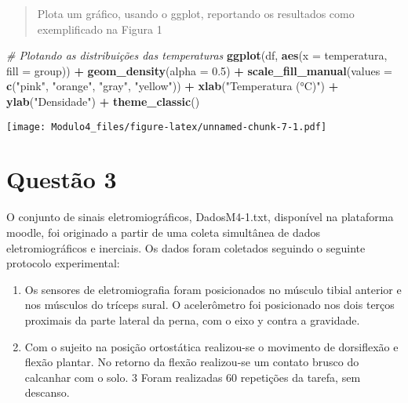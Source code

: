 \documentclass[
]{article}
\newenvironment{Shaded}{\begin{snugshade}}{\end{snugshade}}
\newcommand{\AttributeTok}[1]{\textcolor[rgb]{0.13,0.29,0.53}{#1}}
\newcommand{\CommentTok}[1]{\textcolor[rgb]{0.56,0.35,0.01}{\textit{#1}}}
\newcommand{\FloatTok}[1]{\textcolor[rgb]{0.00,0.00,0.81}{#1}}
\newcommand{\FunctionTok}[1]{\textcolor[rgb]{0.13,0.29,0.53}{\textbf{#1}}}
\newcommand{\NormalTok}[1]{#1}
\newcommand{\SpecialCharTok}[1]{\textcolor[rgb]{0.81,0.36,0.00}{\textbf{#1}}}
\newcommand{\StringTok}[1]{\textcolor[rgb]{0.31,0.60,0.02}{#1}}
\providecommand{\tightlist}{%
  \setlength{\itemsep}{0pt}\setlength{\parskip}{0pt}}
\begin{document}
\begin{quote}
Plota um gráfico, usando o ggplot, reportando os resultados como
exemplificado na Figura 1
\end{quote}

\begin{Shaded}
\begin{Highlighting}[]
\CommentTok{\# Plotando as distribuições das temperaturas}
\FunctionTok{ggplot}\NormalTok{(df, }\FunctionTok{aes}\NormalTok{(}\AttributeTok{x =}\NormalTok{ temperatura, }\AttributeTok{fill =}\NormalTok{ group)) }\SpecialCharTok{+}
  \FunctionTok{geom\_density}\NormalTok{(}\AttributeTok{alpha =} \FloatTok{0.5}\NormalTok{) }\SpecialCharTok{+}
  \FunctionTok{scale\_fill\_manual}\NormalTok{(}\AttributeTok{values =} \FunctionTok{c}\NormalTok{(}\StringTok{"pink"}\NormalTok{, }\StringTok{"orange"}\NormalTok{, }\StringTok{"gray"}\NormalTok{, }\StringTok{"yellow"}\NormalTok{)) }\SpecialCharTok{+}
  \FunctionTok{xlab}\NormalTok{(}\StringTok{"Temperatura (°C)"}\NormalTok{) }\SpecialCharTok{+}
  \FunctionTok{ylab}\NormalTok{(}\StringTok{"Densidade"}\NormalTok{) }\SpecialCharTok{+}
  \FunctionTok{theme\_classic}\NormalTok{()}
\end{Highlighting}
\end{Shaded}

\texttt{[image: Modulo4\_files/figure-latex/unnamed-chunk-7-1.pdf]}

\newpage
\section*{Questão 3}

O conjunto de sinais eletromiográficos, DadosM4-1.txt, disponível na
plataforma moodle, foi originado a partir de uma coleta simultânea de
dados eletromiográficos e inerciais. Os dados foram coletados seguindo o
seguinte protocolo experimental:

\begin{enumerate}
\def\labelenumi{\arabic{enumi}.}
\tightlist
\item
  Os sensores de eletromiografia foram posicionados no músculo tibial
  anterior e nos músculos do tríceps sural. O acelerômetro foi
  posicionado nos dois terços proximais da parte lateral da perna, com o
  eixo y contra a gravidade.
\item
  Com o sujeito na posição ortostática realizou-se o movimento de
  dorsiflexão e flexão plantar. No retorno da flexão realizou-se um
  contato brusco do calcanhar com o solo. 3 Foram realizadas 60
  repetições da tarefa, sem descanso.
\end{enumerate}
\end{document}
